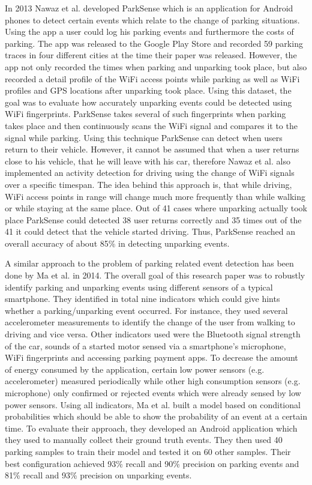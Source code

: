 In 2013 Nawaz et al. developed ParkSense \cite{Nawaz:2013:PSB:2500423.2500438} which is an application for Android phones to detect certain events which relate to the change of parking situations. Using the app a user could log his parking events and furthermore the costs of parking. The app was released to the Google Play Store and recorded 59 parking traces in four different cities at the time their paper was released. However, the app not only recorded the times when parking and unparking took place, but also recorded a detail profile of the WiFi access points while parking as well as WiFi profiles and GPS locations after unparking took place. Using this dataset, the goal was to evaluate how accurately unparking events could be detected using WiFi fingerprints. ParkSense takes several of such fingerprints when parking takes place and then continuously scans the WiFi signal and compares it to the signal while parking. Using this technique ParkSense can detect when users return to their vehicle. However, it cannot be assumed that when a user returns close to his vehicle, that he will leave with his car, therefore Nawaz et al. also implemented an activity detection for driving using the change of WiFi signals over a specific timespan. The idea behind this approach is, that while driving, WiFi access points in range will change much more frequently than while walking or while staying at the same place. Out of 41 cases where unparking actually took place ParkSense could detected 38 user returns correctly and 35 times out of the 41 it could detect that the vehicle started driving. Thus, ParkSense reached an overall accuracy of about 85\% in detecting unparking events.

A similar approach to the problem of parking related event detection has been done by Ma et al. \cite{Ma:2014:USP:2674918.2674929} in 2014. The overall goal of this research paper was to robustly identify parking and unparking events using different sensors of a typical smartphone. They identified in total nine indicators which could give hints whether a parking/unparking event occurred. For instance, they used several accelerometer measurements to identify the change of the user from walking to driving and vice versa. Other indicators used were the Bluetooth signal strength of the car, sounds of a started motor sensed via a smartphone's microphone, WiFi fingerprints and accessing parking payment apps. To decrease the amount of energy consumed by the application, certain low power sensors (e.g. accelerometer) measured periodically while other high consumption sensors (e.g. microphone) only confirmed or rejected events which were already sensed by low power sensors. Using all indicators, Ma et al. built a model based on conditional probabilities which should be able to show the probability of an event at a certain time. To evaluate their approach, they developed an Android application which they used to manually collect their ground truth events. They then used 40 parking samples to train their model and tested it on 60 other samples. Their best configuration achieved 93\% recall and 90\% precision on parking events and 81\% recall and 93\% precision on unparking events.

